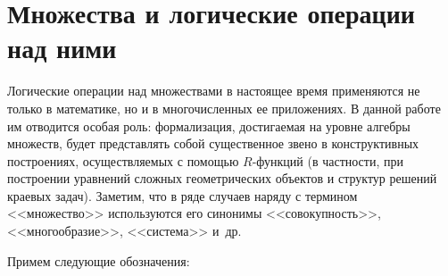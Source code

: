 \section{Множества и логические операции над ними}

Логические операции над множествами в настоящее время применяются не только
в математике, но и в многочисленных ее приложениях. В данной работе им
отводится особая роль: формализация, достигаемая на уровне алгебры
множеств, будет представлять собой существенное звено в конструктивных
построениях, осуществляемых с помощью $R$-функций (в частности, при
построении уравнений сложных геометрических объектов и структур решений
краевых задач). Заметим, что в ряде случаев наряду с термином
<<множество>> используются его синонимы <<совокупность>>,
<<многообразие>>, <<система>> и~др.

Примем следующие обозначения:


